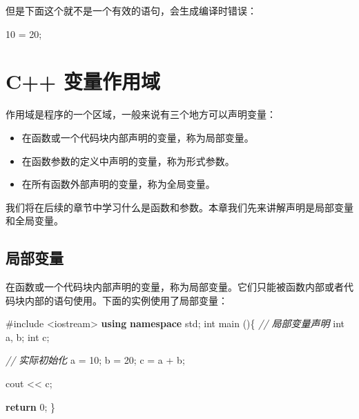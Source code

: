 \documentclass[
]{article}
\newenvironment{Shaded}{}{}
\newcommand{\CommentTok}[1]{\textcolor[rgb]{0.38,0.63,0.69}{\textit{#1}}}
\newcommand{\ControlFlowTok}[1]{\textcolor[rgb]{0.00,0.44,0.13}{\textbf{#1}}}
\newcommand{\DataTypeTok}[1]{\textcolor[rgb]{0.56,0.13,0.00}{#1}}
\newcommand{\DecValTok}[1]{\textcolor[rgb]{0.25,0.63,0.44}{#1}}
\newcommand{\ImportTok}[1]{#1}
\newcommand{\KeywordTok}[1]{\textcolor[rgb]{0.00,0.44,0.13}{\textbf{#1}}}
\newcommand{\NormalTok}[1]{#1}
\newcommand{\OperatorTok}[1]{\textcolor[rgb]{0.40,0.40,0.40}{#1}}
\newcommand{\PreprocessorTok}[1]{\textcolor[rgb]{0.74,0.48,0.00}{#1}}
\providecommand{\tightlist}{%
  \setlength{\itemsep}{0pt}\setlength{\parskip}{0pt}}
\begin{document}
但是下面这个就不是一个有效的语句，会生成编译时错误：

\begin{Shaded}
\begin{Highlighting}[]
\DecValTok{10} \OperatorTok{=} \DecValTok{20}\OperatorTok{;}
\end{Highlighting}
\end{Shaded}

\hypertarget{c-ux53d8ux91cfux4f5cux7528ux57df}{%
\section{C++ 变量作用域}\label{c-ux53d8ux91cfux4f5cux7528ux57df}}

作用域是程序的一个区域，一般来说有三个地方可以声明变量：

\begin{itemize}
\tightlist
\item
  在函数或一个代码块内部声明的变量，称为局部变量。
\item
  在函数参数的定义中声明的变量，称为形式参数。
\item
  在所有函数外部声明的变量，称为全局变量。
\end{itemize}

我们将在后续的章节中学习什么是函数和参数。本章我们先来讲解声明是局部变量和全局变量。

\hypertarget{ux5c40ux90e8ux53d8ux91cf}{%
\subsection{局部变量}\label{ux5c40ux90e8ux53d8ux91cf}}

在函数或一个代码块内部声明的变量，称为局部变量。它们只能被函数内部或者代码块内部的语句使用。下面的实例使用了局部变量：

\begin{Shaded}
\begin{Highlighting}[]
\PreprocessorTok{\#include }\ImportTok{\textless{}iostream\textgreater{}}
\KeywordTok{using} \KeywordTok{namespace}\NormalTok{ std}\OperatorTok{;}
 \DataTypeTok{int}\NormalTok{ main }\OperatorTok{()\{}
  \CommentTok{// 局部变量声明}
  \DataTypeTok{int}\NormalTok{ a}\OperatorTok{,}\NormalTok{ b}\OperatorTok{;}
  \DataTypeTok{int}\NormalTok{ c}\OperatorTok{;}
 
  \CommentTok{// 实际初始化}
\NormalTok{  a }\OperatorTok{=} \DecValTok{10}\OperatorTok{;}
\NormalTok{  b }\OperatorTok{=} \DecValTok{20}\OperatorTok{;}
\NormalTok{  c }\OperatorTok{=}\NormalTok{ a }\OperatorTok{+}\NormalTok{ b}\OperatorTok{;}
 
\NormalTok{  cout }\OperatorTok{\textless{}\textless{}}\NormalTok{ c}\OperatorTok{;}
 
  \ControlFlowTok{return} \DecValTok{0}\OperatorTok{;}
\OperatorTok{\}}
\end{Highlighting}
\end{Shaded}
\end{document}
